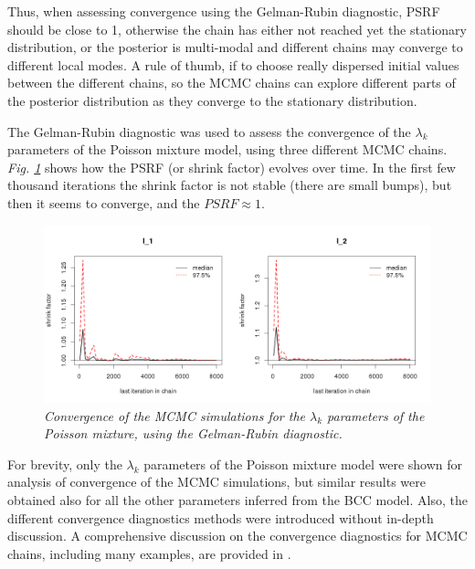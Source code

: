 Thus, when assessing convergence using the Gelman-Rubin diagnostic, PSRF should be close to 1, otherwise the chain has either not reached yet the stationary distribution, or the posterior is multi-modal and different chains may converge to different local modes. A rule of thumb, if to choose really dispersed initial values between the different chains, so the MCMC chains can explore different parts of the posterior distribution as they converge to the stationary distribution.

The Gelman-Rubin diagnostic was used to assess the convergence of the $\lambda_{k}$ parameters of the Poisson mixture model, using three different MCMC chains. \emph{Fig. \ref{psrf-lambda-pic}} shows how the PSRF (or shrink factor) evolves over time. In the first few thousand iterations the shrink factor is not stable (\ie there are small bumps), but then it seems to converge, and the $PSRF \approx 1$.  
\begin{figure}[!ht]
\begin{center}
 \includegraphics[scale = 0.42]{images/psrf-l.png}
\caption{\emph{Convergence of the MCMC simulations for the $\lambda_{k}$ parameters of the Poisson mixture, using the Gelman-Rubin diagnostic.}}
\label{psrf-lambda-pic}
\end{center}
\end{figure}

For brevity, only the $\lambda_{k}$ parameters of the Poisson mixture model were shown for analysis of convergence of the MCMC simulations, but similar results were obtained also for all the other parameters inferred from the BCC model. Also, the different convergence diagnostics methods were introduced without in-depth discussion. A comprehensive discussion on the convergence diagnostics for MCMC chains, including many examples, are provided in \citep{Brooks1999, Robert2009}.